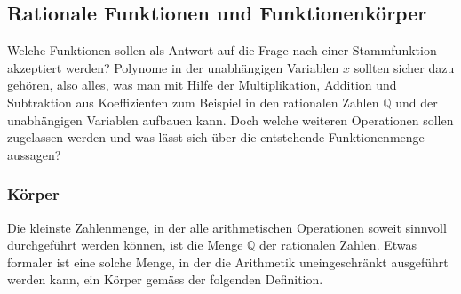 %
%
%
\subsection{Rationale Funktionen und Funktionenkörper
\label{buch:integral:subsection:rational}}
Welche Funktionen sollen als Antwort auf die Frage nach einer Stammfunktion
akzeptiert werden?
Polynome in der unabhängigen Variablen $x$ sollten sicher dazu gehören,
also alles, was man mit Hilfe der Multiplikation, Addition und Subtraktion
aus Koeffizienten zum Beispiel in den rationalen Zahlen $\mathbb{Q}$ und
der unabhängigen Variablen aufbauen kann.
Doch welche weiteren Operationen sollen zugelassen werden und was lässt
sich über die entstehende Funktionenmenge aussagen?

\subsubsection{Körper}
Die kleinste Zahlenmenge, in der alle arithmetischen Operationen soweit
sinnvoll durchgeführt werden können, ist die Menge $\mathbb{Q}$ der
rationalen Zahlen.
Etwas formaler ist eine solche Menge, in der die Arithmetik uneingeschränkt
ausgeführt werden kann, ein Körper gemäss der folgenden Definition.
%

